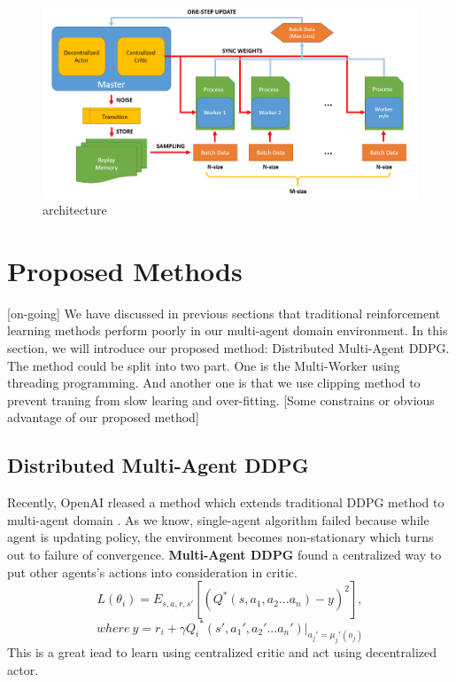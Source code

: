 \documentclass[11pt,twocolumn]{jarticle} %
\begin{document}
\begin{figure}[t]
 \begin{center}
  \includegraphics[width=12cm]{imgs/architecture.PNG}
  \caption{architecture}
  \label{fig:architecture}
 \end{center}
\end{figure}

\section{Proposed Methods}[on-going]
We have discussed in previous sections that traditional reinforcement learning methods perform poorly in our multi-agent domain environment. In this section, we will introduce our proposed method: Distributed Multi-Agent DDPG. The method could be split into two part. One is the Multi-Worker using threading programming. And another one is that we use clipping method to prevent traning from slow learing and over-fitting.
[Some constrains or obvious advantage of our proposed method]

\subsection{Distributed Multi-Agent DDPG}
Recently, OpenAI rleased a method which extends traditional DDPG method to multi-agent domain \cite{maddpg}. As we know, single-agent algorithm failed because while agent is updating policy, the environment becomes non-stationary which turns out to failure of convergence. \textbf{Multi-Agent DDPG} found a centralized way to put other agents's actions into consideration in critic.
\begin{equation}
L(\theta_i) = E_{s,a,r,s'}[(Q^*(s, a_1, a_2 ... a_n) - y)^2],  
\end{equation}
$$where\ y = r_i + \gamma{Q_i}^*(s', a_1', a_2' ... a_n') | _{a_j'=\mu_j'(o_j)}$$
This is a great iead to learn using centralized critic and act using decentralized actor. 
\end{document}

